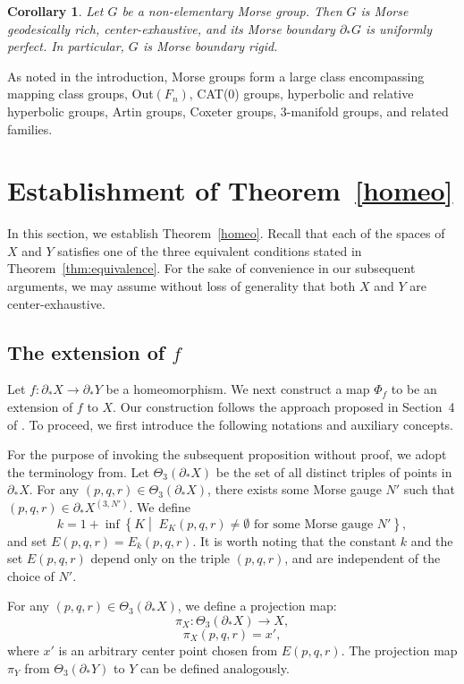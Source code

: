 \documentclass[a4paper,11pt,oneside]{article}
\newtheorem{Corollary}[Theorem]{Corollary}
\begin{document}
\begin{Corollary}
      Let $G$ be a non-elementary Morse group. Then $G$ is Morse geodesically rich, center-exhaustive, and its Morse boundary $\partial_*G$ is uniformly perfect. In particular, $G$ is Morse boundary rigid.
\end{Corollary}

 As noted in the introduction, Morse groups form a large class encompassing mapping class groups, Out$(F_n)$, CAT(0) groups, hyperbolic and relative hyperbolic groups, Artin groups, Coxeter groups, 3-manifold groups, and related families.


\section{Establishment of Theorem~\ref{homeo}}

    In this section, we establish Theorem~\ref{homeo}. Recall that each of the spaces of $X$ and $Y$ satisfies one of the three equivalent conditions stated in Theorem~\ref{thm:equivalence}. For the sake of convenience in our subsequent arguments, we may assume without loss of generality that both $X$ and $Y$ are center-exhaustive.

\subsection{The extension of \ensuremath{f}}  
    Let $f:\partial_*X\to \partial_*Y$ be a homeomorphism. We next construct a map $\Phi_{f}$ to be an extension of $f$ to $X$. 
    Our construction follows the approach proposed in Section~4 of \cite{Liu22}. To proceed, we first introduce the following notations and auxiliary concepts.

For the purpose of invoking the subsequent proposition without proof, we adopt the terminology from. Let $\Theta_3(\partial_* X)$ be the set of all distinct triples of points in $\partial_*X$. 
For any $(p, q, r)\in \Theta_3(\partial_*X)$, there exists some Morse gauge $N'$ such that $(p, q, r)\in  \partial_*X^{(3, N')}$. 
We define 
\[
k=1+\inf\! \left\{ K \middle|\!\; E_K(p, q, r)\neq \emptyset \text{ for some Morse gauge } N' \right\},
\] and set $E(p, q, r)=E_k(p, q, r)$. It is worth noting that the constant $k$ and the set $E(p,q,r)$ depend only on the triple $(p, q, r)$, and are independent of the choice of $N'$.

For any $(p, q, r)\in \Theta_3(\partial_*X)$, we define a projection map:
\[
\pi_X:\Theta_3(\partial_*X)\to X, 
\]
\[
\pi_X(p, q, r)=x',
\]
where $x'$ is an arbitrary center point chosen from $E(p ,q, r)$. The projection map $\pi_Y$ from $\Theta_3(\partial_* Y)$ to $Y$ can be defined analogously.
\end{document}
